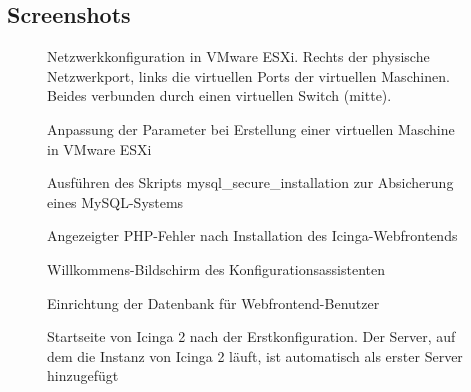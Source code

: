 \subsection{Screenshots}
\label{Screenshots}

\begin{figure}[htb]
\centering
{}
\caption{Netzwerkkonfiguration in VMware ESXi. Rechts der physische Netzwerkport, links die virtuellen Ports der virtuellen Maschinen. Beides verbunden durch einen virtuellen Switch (mitte).}
\label{screen:vmnetwork}
\end{figure}

\begin{figure}[htb]
\centering
{}
\caption{Anpassung der Parameter bei Erstellung einer virtuellen Maschine in VMware ESXi}
\label{screen:vmcreation}
\end{figure}
\clearpage

\begin{figure}[!htb]
\centering
{}
\caption{Ausführen des Skripts \glqq{}mysql\_{}secure\_{}installation\grqq{} zur Absicherung eines MySQL-Systems}
\label{screen:mysqlsecure}
\end{figure}

\begin{figure}[!htb]
\centering
{}
\caption{Angezeigter PHP-Fehler nach Installation des Icinga-Webfrontends}
\label{screen:phperror}
\end{figure}

\begin{figure}[!htb]
\centering
{}
\caption{Willkommens-Bildschirm des Konfigurationsassistenten}
\label{screen:konfigassistent}
\end{figure}

\begin{figure}[!htb]
\centering
{}
\caption{Einrichtung der Datenbank für Webfrontend-Benutzer}
\label{screen:userdb}
\end{figure}

\begin{figure}[!htb]
\centering
{}
\caption{Startseite von \glqq{}Icinga 2\grqq{} nach der Erstkonfiguration. Der Server, auf dem die Instanz von \glqq{}Icinga 2\grqq{} läuft, ist automatisch als erster Server hinzugefügt}
\label{screen:landingpage}
\end{figure}

